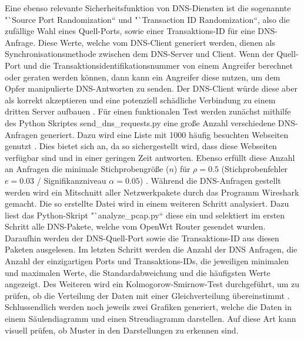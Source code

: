 \documentclass[a4paper]{book}
\begin{document}
\begin{large}
\begin{onehalfspace}
\indent Eine ebenso relevante Sicherheitsfunktion von DNS-Diensten ist die sogenannte "`Source Port Randomization“ und "`Transaction ID Randomization“, also die zufällige Wahl eines Quell-Ports, sowie einer Transaktions-ID für eine DNS-Anfrage. Diese Werte, welche vom DNS-Client generiert werden, dienen als Synchronisationsmethode zwischen dem DNS-Server und Client. Wenn der Quell-Port und die Transaktionsidentifikationsnummer von einem Angreifer berechnet oder geraten werden können, dann kann ein Angreifer diese nutzen, um dem Opfer manipulierte DNS-Antworten zu senden. Der DNS-Client würde diese aber als korrekt akzeptieren und eine potenziell schädliche Verbindung zu einem dritten Server aufbauen \cite{Microsoft.2008}. Für einen funktionalen Test werden zunächst mithilfe des Python Skriptes send\_dns\_requests.py eine große Anzahl verschiedene DNS-Anfragen generiert. Dazu wird eine Liste mit 1000 häufig besuchten Webseiten genutzt \cite{BenSooter.15.03.2016}. Dies bietet sich an, da so sichergestellt wird, dass diese Webseiten verfügbar sind und in einer geringen Zeit antworten. Ebenso erfüllt diese Anzahl an Anfragen die minimale Stichprobengröße ($n$) für $\rho = 0.5$ (Stichprobenfehler $e = 0.03$ / Signifikanzniveau $\alpha = 0.05$) \cite[p.~13]{Gabler2016}. Während die DNS-Anfragen gestellt werden wird ein Mitschnitt aller Netzwerkpakete durch das Programm Wireshark gemacht. Die so erstellte Datei wird in einem weiteren Schritt analysiert. Dazu liest das Python-Skript "`analyze\_pcap.py“ diese ein und selektiert im ersten Schritt alle DNS-Pakete, welche vom OpenWrt Router gesendet wurden. Daraufhin werden der DNS-Quell-Port sowie die Transaktions-ID aus diesen Paketen ausgelesen. Im letzten Schritt werden die Anzahl der DNS Anfragen, die Anzahl der einzigartigen Ports und Transaktions-IDs, die jeweiligen minimalen und maximalen Werte, die Standardabweichung und die häufigsten Werte angezeigt. Des Weiteren wird ein Kolmogorow-Smirnow-Test durchgeführt, um zu prüfen, ob die Verteilung der Daten mit einer Gleichverteilung übereinstimmt \cite{Frank1951}. Schlussendlich werden noch jeweils zwei Grafiken generiert, welche die Daten in einem Säulendiagramm und einen Streudiagramm darstellen. Auf diese Art kann visuell prüfen, ob Muster in den Darstellungen zu erkennen sind. \\

\vspace{1cm}




\end{onehalfspace}
\end{large}
\end{document}

